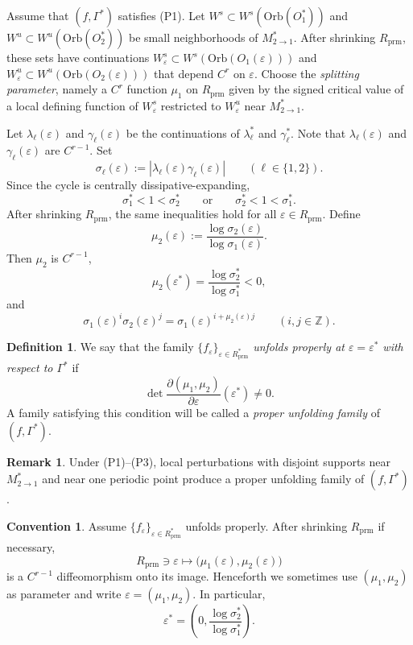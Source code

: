 \documentclass[11pt,a4paper]{article}
\theoremstyle{plain}
\theoremstyle{definition}
\newtheorem{definition}[theorem]{Definition}
\newtheorem{remark}[theorem]{Remark}
\newtheorem{convention}[theorem]{Convention}
\theoremstyle{plain}
\numberwithin{equation}{section}
\begin{document}
Assume that $(f,\Gamma^*)$ satisfies \textup{(P1)}. Let $W^s \subset W^s(\mathrm{Orb}(O_1^*))$ and $W^u \subset W^u(\mathrm{Orb}(O_2^*))$ be small neighborhoods of $M_{2 \to 1}^*$. After shrinking $R_\mathrm{prm}$, these sets have continuations $W^s_\varepsilon \subset W^s(\mathrm{Orb}(O_1(\varepsilon)))$ and $W^u_\varepsilon \subset W^u(\mathrm{Orb}(O_2(\varepsilon)))$ that depend $C^r$ on $\varepsilon$. Choose the \emph{splitting parameter}, namely a $C^r$ function $\mu_1$ on $R_\mathrm{prm}$ given by the signed critical value of a local defining function of $W^s_\varepsilon$ restricted to $W^u_\varepsilon$ near $M_{2 \to 1}^*$.

Let $\lambda_\ell(\varepsilon)$ and $\gamma_\ell(\varepsilon)$ be the continuations of $\lambda_\ell^*$ and $\gamma_\ell^*$. Note that $\lambda_\ell(\varepsilon)$ and $\gamma_\ell(\varepsilon)$ are $C^{r - 1}$. Set
\[
\sigma_\ell(\varepsilon) := |\lambda_\ell(\varepsilon)\gamma_\ell(\varepsilon)|
\qquad
(\ell \in \{1,2\}).
\]
Since the cycle is centrally dissipative-expanding,
\[
\sigma_1^* < 1 < \sigma_2^*
\qquad\text{or}\qquad
\sigma_2^* < 1 < \sigma_1^*.
\]
After shrinking $R_\mathrm{prm}$, the same inequalities hold for all $\varepsilon \in R_\mathrm{prm}$. Define
\[
\mu_2(\varepsilon) := \frac{\log \sigma_2(\varepsilon)}{\log \sigma_1(\varepsilon)}.
\]
Then $\mu_2$ is $C^{r - 1}$,
\[
\mu_2(\varepsilon^*) = \frac{\log \sigma_2^*}{\log \sigma_1^*} < 0,
\]
and
\[
\sigma_1(\varepsilon)^i \sigma_2(\varepsilon)^j = \sigma_1(\varepsilon)^{i + \mu_2(\varepsilon)j}
\qquad
(i,j \in \mathbb{Z}).
\]

\begin{definition}
We say that the family $\{f_\varepsilon\}_{\varepsilon \in R_\mathrm{prm}^*}$ \emph{unfolds properly at $\varepsilon = \varepsilon^*$ with respect to $\Gamma^*$} if
\[
\det \frac{\partial(\mu_1,\mu_2)}{\partial\varepsilon}(\varepsilon^*) \neq 0.
\]
A family satisfying this condition will be called a \emph{proper unfolding family} of $(f,\Gamma^*)$.
\end{definition}

\begin{remark}
\label{rem-prm}
Under \textup{(P1)}--\textup{(P3)}, local perturbations with disjoint supports near $M_{2 \to 1}^*$ and near one periodic point produce a proper unfolding family of $(f,\Gamma^*)$.
\end{remark}

\begin{convention}
\label{conv-prm}
Assume $\{f_\varepsilon\}_{\varepsilon \in R_\mathrm{prm}^*}$ unfolds properly. After shrinking $R_\mathrm{prm}$ if necessary,
\[
R_\mathrm{prm} \ni \varepsilon \longmapsto \bigl(\mu_1(\varepsilon),\mu_2(\varepsilon)\bigr)
\]
is a $C^{r - 1}$ diffeomorphism onto its image. Henceforth we sometimes use $(\mu_1,\mu_2)$ as parameter and write $\varepsilon = (\mu_1,\mu_2)$. In particular,
\[
\varepsilon^* = \left(0,\frac{\log \sigma_2^*}{\log \sigma_1^*}\right).
\]
\end{convention}
\end{document}
